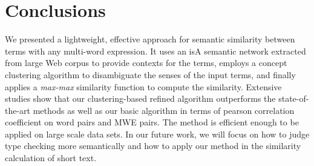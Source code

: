 \section{Conclusions}
\label{sec:conclude}

We presented a lightweight, effective approach for
semantic similarity between terms with any multi-word expression.
It uses an isA semantic network extracted from large Web corpus
to provide contexts for the terms, employs a concept clustering algorithm
to disambiguate the senses of the input terms, and finally applies
a {\em max-max} similarity function to compute the similarity.
Extensive studies show that our clustering-based refined algorithm outperforms the state-of-the-art methods as well
as our basic algorithm in terms of pearson correlation coefficient on word pairs and MWE pairs.
The method is efficient enough to be applied on large scale data sets.
In our future work, we will focus on how to judge type checking more semantically and how to apply our method in the similarity calculation of short text.
